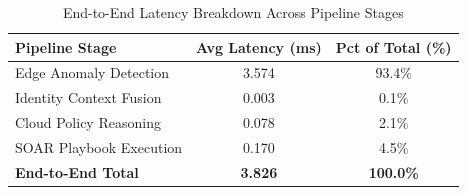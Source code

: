 \begin{table}[htbp]
\caption{End-to-End Latency Breakdown Across Pipeline Stages}
\label{tab:latency_breakdown}
\centering
\begin{tabular}{lcc}
\hline
\textbf{Pipeline Stage} & \textbf{Avg Latency (ms)} & \textbf{Pct of Total (\%)} \\
\hline
Edge Anomaly Detection & 3.574 & 93.4\% \\
Identity Context Fusion & 0.003 & 0.1\% \\
Cloud Policy Reasoning & 0.078 & 2.1\% \\
SOAR Playbook Execution & 0.170 & 4.5\% \\
\hline
\textbf{End-to-End Total} & \textbf{3.826} & \textbf{100.0\%} \\
\hline
\end{tabular}
\end{table}
